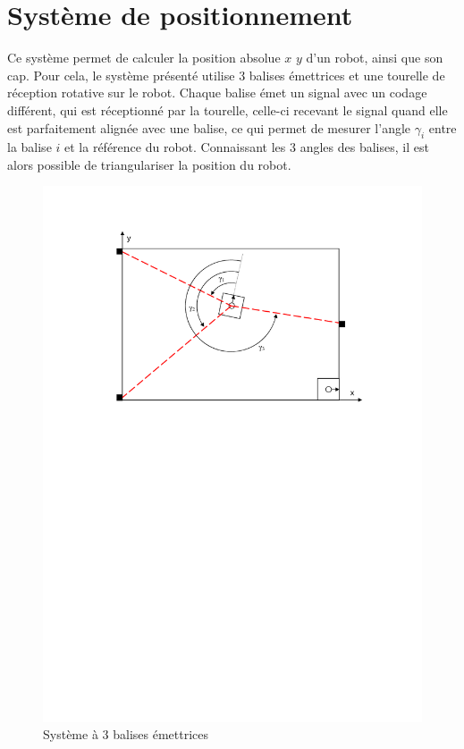 \documentclass[a4paper]{article}
\begin{document}
\section{Système de positionnement}

Ce système permet de calculer la position absolue $x$ $y$ d'un robot, ainsi que son cap. Pour cela, le système présenté utilise 3 balises émettrices et une tourelle de réception rotative sur le robot. Chaque balise émet un signal avec un codage différent, qui est réceptionné par la tourelle, celle-ci recevant le signal quand elle est parfaitement alignée avec une balise, ce qui permet de mesurer l'angle $\gamma_{i}$ entre la balise $i$ et la référence du robot. Connaissant les 3 angles des balises, il est alors possible de triangulariser la position du robot.

\begin{figure}[H]
	\centering
	\includegraphics[scale=1.00]{Images/Systeme_3_balises_emettrices}
	\caption{Système à 3 balises émettrices
		\label{Systeme_3_balises_emettrices}}
\end{figure}
\end{document}
